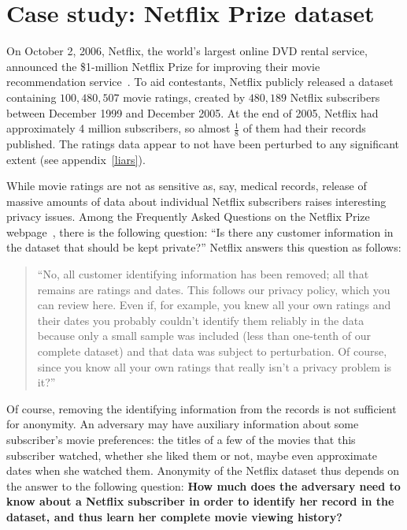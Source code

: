 \documentclass[11pt]{article}
\begin{document}
\section{Case study: Netflix Prize dataset}
\label{sec:netflix}

On October 2, 2006, Netflix, the world's largest online DVD rental
service, announced the \$1-million Netflix Prize for improving their movie
recommendation service~\cite{nyt}.  To aid contestants, Netflix publicly
released a dataset containing $100,480,507$ movie ratings, created by
$480,189$ Netflix subscribers between December 1999 and December 2005.
At the end of 2005, Netflix had approximately 4 million subscribers, so
almost $\frac{1}{8}$ of them had their records published.  The ratings
data appear to not have been perturbed to any significant extent (see
appendix~\ref{liars}).

While movie ratings are not as sensitive as, say, medical records,
release of massive amounts of data about individual Netflix subscribers
raises interesting privacy issues.  Among the Frequently Asked Questions
on the Netflix Prize webpage~\cite{faq}, there is the following question:
``Is there any customer information in the dataset that should be kept
private?''  Netflix answers this question as follows:

\begin{quote}
``No, all customer identifying information has been removed; all that remains are ratings and dates. This follows our privacy policy, which you can review here. Even if, for example, you knew all your own ratings and their dates you probably couldn't identify them reliably in the data because only a small sample was included (less than one-tenth of our complete dataset) and that data was subject to perturbation. Of course, since you know all your own ratings that really isn't a privacy problem is it?''
\end{quote}

Of course, removing the identifying information from the records is not
sufficient for anonymity.  An adversary may have auxiliary information
about some subscriber's movie preferences: the titles of a few of the
movies that this subscriber watched, whether she liked them or not, maybe
even approximate dates when she watched them.  Anonymity of the Netflix
dataset thus depends on the answer to the following question: \textbf{How
much does the adversary need to know about a Netflix subscriber in order
to identify her record in the dataset, and thus learn her complete movie
viewing history?}
\end{document}
